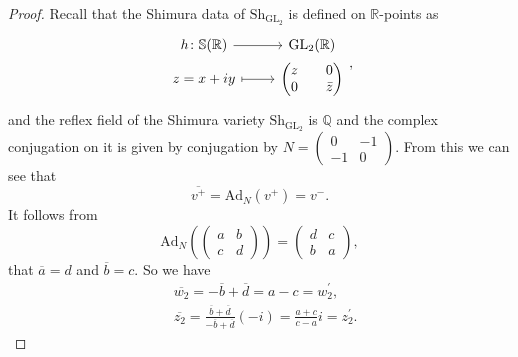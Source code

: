 \documentclass[11pt, a4paper]{amsart}
\theoremstyle{plain}
\theoremstyle{definition}
\numberwithin{equation}{section}
\def\QQ{\mathbb{Q}}
\def\RR{\mathbb{R}}
\DeclareMathOperator{\GL}{\mathrm{GL}}
\newcommand{\Sh}{\mathrm{Sh}}
\begin{document}
\begin{proof}
        Recall that the Shimura data of $\Sh_{\GL_2}$ is defined on $\RR$-points as 
            \begin{equation*}
             \begin{tikzcd}[row sep = 0]
                 h \colon \mathbb{S}(\RR) \ar[r] & \GL_2(\RR) \\
                    z = x + iy \ar[r, mapsto] & \begin{pmatrix}
                                                    z & 0 \\
                                                    0 & \bar{z}
                                                \end{pmatrix}
             \end{tikzcd},
            \end{equation*}
            and the reflex field of the Shimura variety $\Sh_{\GL_2}$ is $\QQ$ and the complex conjugation on it is given by conjugation by 
                           $N = \begin{pmatrix}
                                    0 & -1 \\
                                    -1 & 0 
                                \end{pmatrix}$. From this we can see that 
        \begin{equation*}
            \overline{v^{+}} = \mathrm{Ad}_{N}(v^{+}) = v^{-}. 
        \end{equation*}
        It follows from 
        \begin{equation*}
            \mathrm{Ad}_{N}( \begin{pmatrix}
                                a & b \\
                                c & d
                             \end{pmatrix}) = \begin{pmatrix}
                                                 d & c\\
                                                 b & a 
                                              \end{pmatrix},
        \end{equation*}
        that $\overline{a} = d$ and $\overline{b} = c$.  So we have 
        \begin{align*}
            & \overline{w_2} = -\overline{b} + \overline{d} = a - c = w_2^{\prime}, \\
            & \overline{z_2} = \frac{\overline{b} + \overline{d}}{-\overline{b} + \overline{d}}(-i) = \frac{a + c}{c - a}i = z_2^{\prime}. 

\end{align*}
\end{proof}
\end{document}
